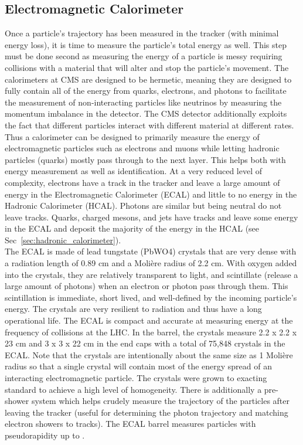 	\subsection{Electromagnetic Calorimeter}
	\label{sec:electromagnetic_calorimeter}
	Once a particle's trajectory has been measured in the tracker (with minimal energy loss), it is time to measure the particle's total energy as well. This step must be done second as measuring the energy of a particle is messy requiring collisions with a material that will alter and stop the particle's movement. The calorimeters at CMS are designed to be hermetic, meaning they are designed to fully contain all of the energy from quarks, electrons, and photons to facilitate the measurement of non-interacting particles like neutrinos by measuring the momentum imbalance in the detector. The CMS detector additionally exploits the fact that different particles interact with different material at different rates. Thus a calorimeter can be designed to primarily measure the energy of electromagnetic particles such as electrons and muons while letting hadronic particles (quarks) mostly pass through to the next layer. This helps both with energy measurement as well as identification. At a very reduced level of complexity, electrons have a track in the tracker and leave a large amount of energy in the Electromagnetic Calorimeter (ECAL) and little to no energy in the Hadronic Calorimeter (HCAL). Photons are similar but being neutral do not leave tracks. Quarks, charged mesons, and jets have tracks and leave some energy in the ECAL and deposit the majority of the energy in the HCAL (see Sec~\ref{sec:hadronic_calorimeter}).\\
	
	The ECAL is made of lead tungstate (PbWO4) crystals that are very dense with a radiation length of 0.89 cm and a Moli\`{e}re radius of 2.2 cm. With oxygen added into the crystals, they are relatively transparent to light, and scintillate (release a large amount of photons) when an electron or photon pass through them. This scintillation is immediate, short lived, and well-defined by the incoming particle's energy. The crystals are very resilient to radiation and thus have a long operational life. The ECAL is compact and accurate at measuring energy at the frequency of collisions at the LHC. In the barrel, the crystals measure 2.2 x 2.2 x 23 cm and 3 x 3 x 22 cm in the end caps with a total of 75,848 crystals in the ECAL. Note that the crystals are intentionally about the same size as 1 Moli\`{e}re radius so that a single crystal will contain most of the energy spread of an interacting electromagnetic particle. The crystals were grown to exacting standard to achieve a high level of homogeneity. There is additionally a pre-shower system which helps crudely measure the trajectory of the particles after leaving the tracker (useful for determining the photon trajectory and matching electron showers to tracks). The ECAL barrel measures particles with pseudorapidity up to \abseta {}.\\
	
